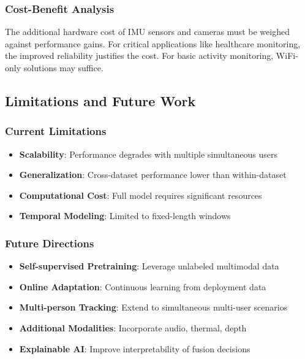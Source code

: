 \documentclass[journal]{IEEEtran}
\begin{document}
\subsubsection{Cost-Benefit Analysis}

The additional hardware cost of IMU sensors and cameras must be weighed against performance gains. For critical applications like healthcare monitoring, the improved reliability justifies the cost. For basic activity monitoring, WiFi-only solutions may suffice.

\subsection{Limitations and Future Work}

\subsubsection{Current Limitations}

\begin{itemize}
\item \textbf{Scalability}: Performance degrades with multiple simultaneous users
\item \textbf{Generalization}: Cross-dataset performance lower than within-dataset
\item \textbf{Computational Cost}: Full model requires significant resources
\item \textbf{Temporal Modeling}: Limited to fixed-length windows
\end{itemize}

\subsubsection{Future Directions}

\begin{itemize}
\item \textbf{Self-supervised Pretraining}: Leverage unlabeled multimodal data
\item \textbf{Online Adaptation}: Continuous learning from deployment data
\item \textbf{Multi-person Tracking}: Extend to simultaneous multi-user scenarios
\item \textbf{Additional Modalities}: Incorporate audio, thermal, depth
\item \textbf{Explainable AI}: Improve interpretability of fusion decisions
\end{itemize}
\end{document}
